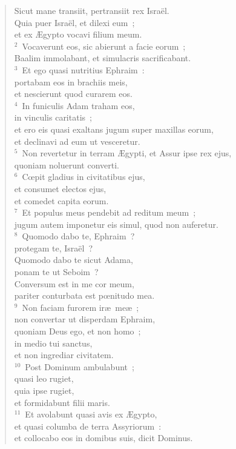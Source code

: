 \begin{flushleft}\begin{verse}\vspace{-19pt}\hspace{6pt}Sicut mane transiit, pertransiit rex Isra\"el.\\\hspace{6pt} Quia puer Isra\"el, et dilexi eum~;\\ et ex \AE gypto vocavi filium meum.\\
${}^{2}$~Vocaverunt eos, sic abierunt a facie eorum~;\\ Baalim immolabant, et simulacris sacrificabant.\\
${}^{3}$~Et ego quasi nutritius Ephraim~:\\ portabam eos in brachiis meis,\\ et nescierunt quod curarem eos.\\
${}^{4}$~In funiculis Adam traham eos,\\ in vinculis caritatis~;\\ et ero eis quasi exaltans jugum super maxillas eorum,\\ et declinavi ad eum ut vesceretur.\\
${}^{5}$~Non revertetur in terram \AE gypti, et Assur ipse rex ejus,\\ quoniam noluerunt converti.\\
${}^{6}$~Cœpit gladius in civitatibus ejus,\\ et consumet electos ejus,\\ et comedet capita eorum.\\
${}^{7}$~Et populus meus pendebit ad reditum meum~;\\ jugum autem imponetur eis simul, quod non auferetur.\\
${}^{8}$~Quomodo dabo te, Ephraim~?\\ protegam te, Isra\"el~?\\ Quomodo dabo te sicut Adama,\\ ponam te ut Seboim~?\\ Conversum est in me cor meum,\\ pariter conturbata est pœnitudo mea.\\
${}^{9}$~Non faciam furorem ir\ae\ me\ae~;\\ non convertar ut disperdam Ephraim,\\ quoniam Deus ego, et non homo~;\\ in medio tui sanctus,\\ et non ingrediar civitatem.\\
${}^{10}$~Post Dominum ambulabunt~;\\ quasi leo rugiet,\\ quia ipse rugiet,\\ et formidabunt filii maris.\\
${}^{11}$~Et avolabunt quasi avis ex \AE gypto,\\ et quasi columba de terra Assyriorum~:\\ et collocabo eos in domibus suis, dicit Dominus.\end{verse}\end{flushleft}


